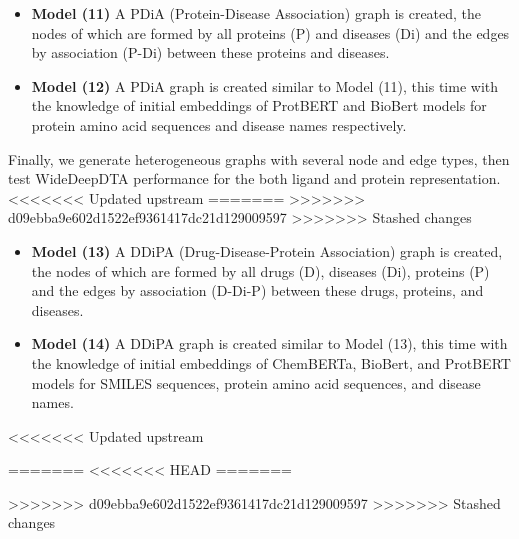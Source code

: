 \begin{itemize}
    \item \textbf{Model (11)} A PDiA (Protein-Disease Association) graph is created, the nodes of which are formed by all proteins (P) and diseases (Di) and the edges by association (P-Di) between these proteins and diseases.  
    \item \textbf{Model (12)} A PDiA graph is created similar to Model (11), this time with the knowledge of initial embeddings of ProtBERT and BioBert models for protein amino acid sequences and disease names respectively. 
\end{itemize}

Finally, we generate heterogeneous graphs with several node and edge types, then test WideDeepDTA performance for the both ligand and protein representation.
<<<<<<< Updated upstream
=======
>>>>>>> d09ebba9e602d1522ef9361417dc21d129009597
>>>>>>> Stashed changes

\begin{itemize}
    \item \textbf{Model (13)} A DDiPA (Drug-Disease-Protein Association) graph is created, the nodes of which are formed by all drugs (D), diseases (Di), proteins (P) and the edges by association (D-Di-P) between these drugs, proteins, and diseases.  
    \item \textbf{Model (14)} A DDiPA graph is created similar to Model (13), this time with the knowledge of initial embeddings of ChemBERTa, BioBert, and ProtBERT models for SMILES sequences, protein amino acid sequences, and disease names.
\end{itemize}

<<<<<<< Updated upstream


=======
<<<<<<< HEAD
=======


>>>>>>> d09ebba9e602d1522ef9361417dc21d129009597
>>>>>>> Stashed changes
